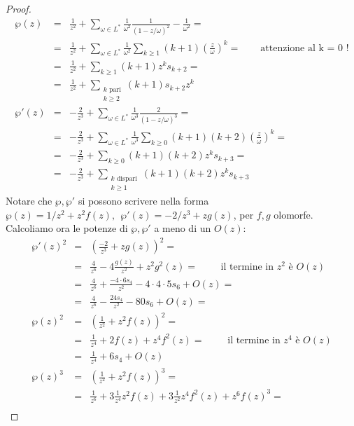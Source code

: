\begin{proof}
\begin{eqnarray*}
\wp(z) & = & \frac{1}{z^2} + \sum_{\omega \in L^*} \frac{1}{\omega^2} \frac{1}{(1-z/\omega)^2} - \frac{1}{\omega^2} = \\
       & = & \frac{1}{z^2} + \sum_{\omega \in L^*} \frac{1}{\omega^2} \sum_{k \ge 1} (k+1) \left ( \frac{z}{\omega} \right ) ^k =  \qquad \text{attenzione al k = $0$ !}\\
       & = & \frac{1}{z^2} + \sum_{k \ge 1} (k+1) z^k s_{k+2} = \\
       & = & \frac{1}{z^2} + \sum_{\substack{k \text{ pari} \\ k \ge 2}} (k+1)s_{k+2} z^k \\
\wp'(z)& = & -\frac{2}{z^3}+ \sum_{\omega \in L^*} \frac{1}{\omega^3} \frac{2}{(1-z/\omega)^3}= \\
       & = & -\frac{2}{z^3}+ \sum_{\omega \in L^*} \frac{1}{\omega^3} \sum_{k \ge 0} (k+1)(k+2) \left ( \frac{z}{\omega} \right ) ^k =\\
       & = & -\frac{2}{z^3} + \sum_{k \ge 0} (k+1)(k+2) z^k s_{k+3} =\\
       & = & -\frac{2}{z^3} + \sum_{\substack{k \text{ dispari} \\ k \ge 1}} (k+1)(k+2) z^k s_{k+3}
\end{eqnarray*}
Notare che $\wp, \wp'$ si possono scrivere nella forma $\wp(z) = 1/z^2 + z^2 f(z), \ \ \wp'(z) = -2/z^3 + zg(z)$, per $f,g$ olomorfe. Calcoliamo ora le potenze di $\wp, \wp'$ a meno di un $O(z)$:
\begin{eqnarray*}
\wp'(z)^2 & = & \left ( \frac{-2}{z^3} + zg(z) \right )^2 = \\
          & = & \frac{4}{z^6} -4\frac{g(z)}{z^2} + z^2g^2(z) = \qquad \text{ il termine in } z^2 \text{ è } O(z)\\
          & = & \frac{4}{z^6} +\frac{-4 \cdot 6s_4 }{z^2} -4 \cdot 4 \cdot 5 s_6 + O(z) = \\
          & = & \frac{4}{z^6} - \frac{24s_4 }{z^2} -80s_6 + O(z) = \\
\wp(z)^2  & = & \left ( \frac{1}{z^2} + z^2f(z) \right )^2 = \\
          & = & \frac{1}{z^4} +2f(z) + z^4f^2(z) = \qquad \text{ il termine in } z^4 \text{ è } O(z)\\
          & = & \frac{1}{z^4} + 6s_4 + O(z) \\
\wp(z)^3  & = & \left ( \frac{1}{z^2} + z^2f(z) \right )^3 = \\
          & = & \frac{1}{z^6} +3\frac{1}{z^4}z^2f(z) + 3 \frac{1}{z^2} z^4 f^2(z) + z^6f(z)^3 = \\

\end{eqnarray*}
\end{proof}

